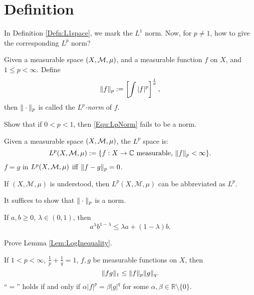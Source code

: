 \section{Definition}
\begin{rem}
    In Definition \ref{Defn:L1space}, we mark the 
    $L^{1}$ norm. Now, for $p\neq 1$, how to give the 
    corresponding $L^{p}$ norm?
\end{rem}
\begin{defn}
    Given a measurable space $(X,\mathcal{M},\mu)$, and a 
    measurable function $f$ on $X$, and $1\le p<\infty$. 
    Define 
    \begin{equation}
        \label{Equ:LpNorm}
        \|f\|_{p}:=\left[\int|f|^{p}\right]^{\frac{1}{p}}, 
    \end{equation}
    then $\|\cdot\|_{p}$ is called the 
    \textit{$L^{p}$-norm} of $f$.
\end{defn}
\begin{exc}
    Show that if $0<p<1$, then \eqref{Equ:LpNorm} fails to be  
    a norm.
\end{exc}
\begin{defn}[$L^{p}$-space]
    \label{Defn:LpSpace}
    Given a measurable space $(X,\mathcal{M},\mu)$, the $L^{p}$ space 
    is:
    \begin{displaymath}
        L^{p}(X,\mathcal{M},\mu):=\{f:X\rightarrow\mathbb{C}
        \text{ measurable, }\|f\|_{p}<\infty\}.
    \end{displaymath}
    $f=g$ in $L^{p}(X,\mathcal{M},\mu)$ iff 
    $\|f-g\|_{p}=0$.
\end{defn}
\begin{ntn}
    If $(X,\mathcal{M},\mu)$ is understood, 
    then $L^{p}(X,\mathcal{M},\mu)$ can be abbreviated as $L^{p}$. 
\end{ntn}
\begin{rem}
    It suffices to show that $\|\cdot\|_{p}$ 
    is a norm.
\end{rem}
\begin{lem}
    \label{Lem:LogInequality}
    If $a,b\ge 0$, $\lambda\in(0,1)$, then 
    \begin{displaymath}
        a^{\lambda}b^{1-\lambda}\le\lambda a+(1-\lambda)b.
    \end{displaymath}
\end{lem}
\begin{exc}
    Prove Lemma \ref{Lem:LogInequality}.
\end{exc}
\begin{thm}
    \label{Thm:Holder}
    If $1<p<\infty$, $\frac{1}{p}+\frac{1}{q}=1$, 
    $f,g$ be measurable functions on $X$, then 
    \begin{equation}
        \label{Equ:HolderInequality}
        \|fg\|_{1}\le\|f\|_{p}\|g\|_{q}.
    \end{equation}
    ``$=$'' holds if and only if $\alpha|f|^{p}=\beta|g|^{q}$ 
    for some $\alpha,\beta\in\mathbb{R}\setminus\{0\}$.
\end{thm}
